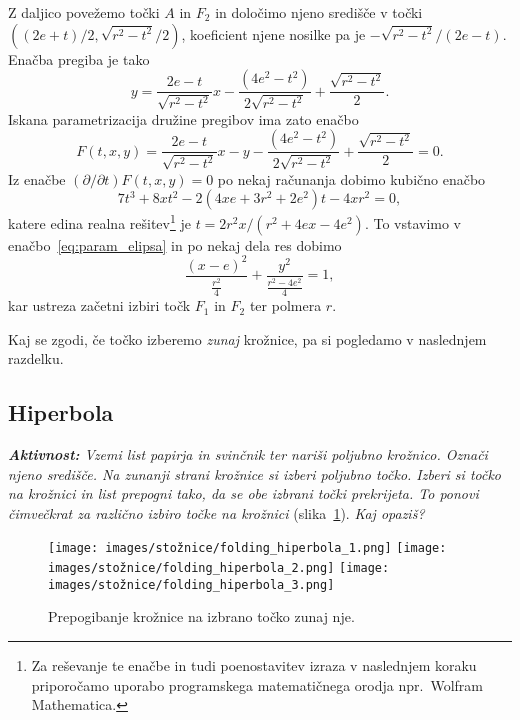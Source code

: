 Z daljico povežemo točki $A$ in $F_2$ in določimo njeno središče v točki $((2e+t)/2, \sqrt{r^2-t^2}/2)$, koeficient njene nosilke pa je $ - \sqrt{r^2-t^2}/(2e-t)$. Enačba pregiba je tako
\begin{equation*}
    \label{eq:tangenta_elipsa}
    y = \frac{2e-t}{\sqrt{r^2-t^2}} x - \frac{(4e^2-t^2)}{2\sqrt{r^2-t^2}} + \frac{\sqrt{r^2-t^2}}{2}.
\end{equation*}
Iskana parametrizacija družine pregibov ima zato enačbo
\begin{equation}
    \label{eq:param_elipsa}
    F(t,x,y) = \frac{2e-t}{\sqrt{r^2-t^2}} x - y - \frac{(4e^2-t^2)}{2\sqrt{r^2-t^2}} + \frac{\sqrt{r^2-t^2}}{2} = 0.
\end{equation}
Iz enačbe $(\partial / \partial t) F(t, x, y) = 0$ po nekaj računanja dobimo kubično enačbo
$$ 7t^3 + 8xt^2 -2(4xe+3r^2+2e^2)t - 4xr^2 = 0,$$
katere edina realna rešitev\footnote{Za reševanje te enačbe in tudi poenostavitev izraza v naslednjem koraku priporočamo uporabo programskega matematičnega orodja npr.\ Wolfram Mathematica.} je $t = 2r^2x/(r^2+4ex-4e^2)$. To vstavimo v enačbo~\eqref{eq:param_elipsa} in po nekaj dela res dobimo
\begin{equation*}
    \frac{(x-e)^2}{\frac{r^2}{4}} + \frac{y^2}{\frac{r^2-4e^2}{4}} = 1,
\end{equation*}
kar ustreza začetni izbiri točk $F_1$ in $F_2$ ter polmera $r$.

Kaj se zgodi, če točko izberemo \emph{zunaj} krožnice, pa si pogledamo v naslednjem razdelku.

\subsection{Hiperbola}

\textit{\textbf{Aktivnost:} Vzemi list papirja in svinčnik ter nariši poljubno krožnico. Označi njeno središče. Na zunanji strani krožnice si izberi poljubno točko. Izberi si točko na krožnici in list prepogni tako, da se obe izbrani točki prekrijeta. To ponovi čimvečkrat za različno izbiro točke na krožnici} (slika~\ref{fig:koraki_hiperbola}). \textit{Kaj opaziš?}

\begin{figure}[h]
    \centering
    \texttt{[image: images/stožnice/folding\_hiperbola\_1.png]}
    \texttt{[image: images/stožnice/folding\_hiperbola\_2.png]}
    \texttt{[image: images/stožnice/folding\_hiperbola\_3.png]}
    \caption[Prepogibanje hiperbole]{Prepogibanje krožnice na izbrano točko zunaj nje.}
    \label{fig:koraki_hiperbola}
\end{figure}

